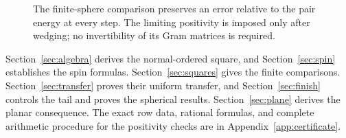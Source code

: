 \begin{figure}[t]
\centering

\caption{The finite-sphere comparison preserves an error relative to the
pair energy at every step. The limiting positivity is imposed only after
wedging; no invertibility of its Gram matrices is required.}
\label{fig:transfer}
\end{figure}


Section~\ref{sec:algebra} derives the normal-ordered square, and
Section~\ref{sec:spin} establishes the spin formulas.
Section~\ref{sec:squares} gives the finite comparisons.
Section~\ref{sec:transfer} proves their uniform transfer, and
Section~\ref{sec:finish} controls the tail and proves the spherical results.
Section~\ref{sec:plane} derives the planar consequence.
The exact row data, rational formulas, and complete arithmetic procedure
for the positivity checks are in Appendix~\ref{app:certificate}.
